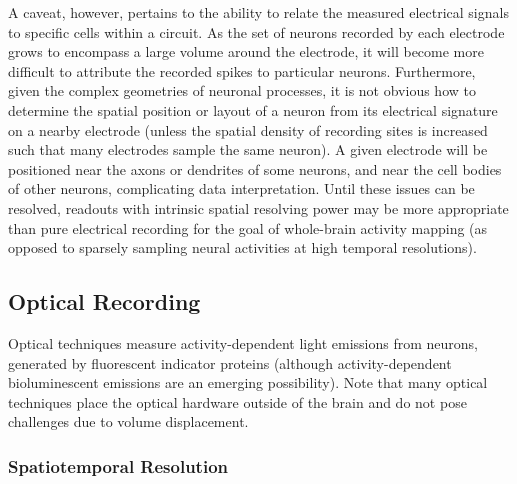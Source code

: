 A caveat, however, pertains to the ability to relate the measured electrical signals to specific cells within a circuit.
As the set of neurons recorded by each electrode grows to encompass a large volume around the electrode, it will become more difficult to attribute the recorded spikes to particular neurons.
Furthermore, given the complex geometries of neuronal processes, it is not obvious how to determine the spatial position or layout of a neuron from its electrical signature on a nearby electrode (unless the spatial density of recording sites is increased such that many electrodes sample the same neuron).
A given electrode will be positioned near the axons or dendrites of some neurons, and near the cell bodies of other neurons, complicating data interpretation.
Until these issues can be resolved, readouts with intrinsic spatial resolving power may be more appropriate than pure electrical recording for the goal of whole-brain activity mapping (as opposed to sparsely sampling neural activities at high temporal resolutions).

\subsection{Optical Recording}

Optical techniques measure activity-dependent light emissions from neurons, generated by fluorescent indicator proteins (although activity-dependent bioluminescent emissions are an emerging possibility).
Note that many optical techniques place the optical hardware outside of the brain and do not pose challenges due to volume displacement.

\subsubsection{Spatiotemporal Resolution}


